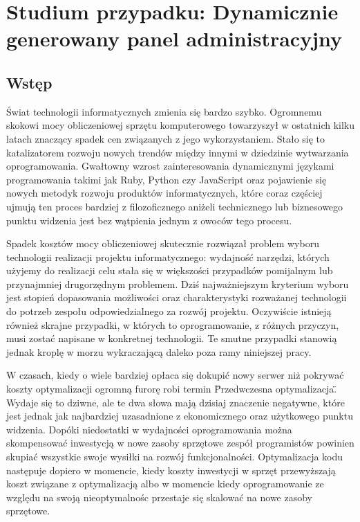 \chapter[Studium przypadku: Dynamicznie generowany panel administracyjny]{Studium przypadku: Dynamicznie generowany panel administracyjny}
  \section{Wstęp}
  Świat technologii informatycznych zmienia się bardzo szybko. Ogromnemu skokowi mocy obliczeniowej sprzętu komputerowego towarzyszył w ostatnich kilku latach znaczący spadek cen związanych z jego wykorzystaniem. Stało się to katalizatorem rozwoju nowych trendów między innymi w dziedzinie wytwarzania oprogramowania. Gwałtowny wzrost zainteresowania dynamicznymi językami programowania takimi jak Ruby, Python czy JavaScript oraz pojawienie się nowych metodyk rozwoju produktów informatycznych, które coraz częściej ujmują ten proces bardziej z filozoficznego aniżeli technicznego lub biznesowego punktu widzenia jest bez wątpienia jednym z owoców tego procesu.
  
  Spadek kosztów mocy obliczeniowej skutecznie rozwiązał problem wyboru technologii realizacji projektu informatycznego: wydajność narzędzi, których użyjemy do realizacji celu stała się w większości przypadków pomijalnym lub przynajmniej drugorzędnym problemem. Dziś najważniejszym kryterium wyboru jest stopień dopasowania możliwości oraz charakterystyki rozważanej technologii do potrzeb zespołu odpowiedzialnego za rozwój projektu. Oczywiście istnieją również skrajne przypadki, w których to oprogramowanie, z różnych przyczyn, musi zostać napisane w konkretnej technologii. Te smutne przypadki stanowią jednak kroplę w morzu wykraczającą daleko poza ramy niniejszej pracy.
  
  W czasach, kiedy o wiele bardziej opłaca się dokupić nowy serwer niż pokrywać koszty optymalizacji ogromną furorę robi termin \"Przedwczesna optymalizacja\". Wydaje się to dziwne, ale te dwa słowa mają dzisiaj znaczenie negatywne, które jest jednak jak najbardziej uzasadnione z ekonomicznego oraz użytkowego punktu widzenia. Dopóki niedostatki w wydajności oprogramowania można skompensować inwestycją w nowe zasoby sprzętowe zespół programistów powinien skupiać wszystkie swoje wysiłki na rozwój funkcjonalności. Optymalizacja kodu następuje dopiero w momencie, kiedy koszty inwestycji w sprzęt przewyższają koszt związane z optymalizacją albo w momencie kiedy oprogramowanie ze względu na swoją nieoptymalnośc przestaje się skalować na nowe zasoby sprzętowe.
  
